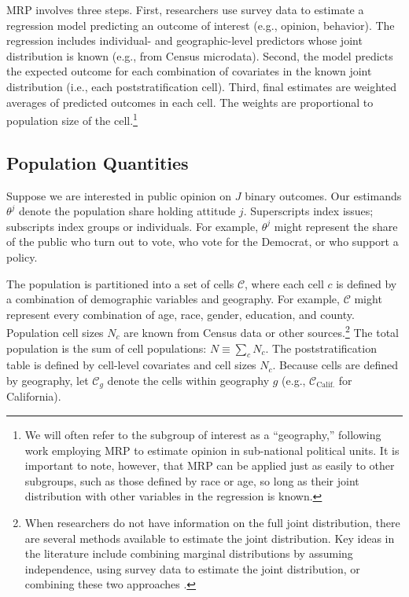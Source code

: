 MRP involves three steps. First, researchers use survey data to estimate a regression model predicting an outcome of interest (e.g., opinion, behavior). 
The regression includes individual- and geographic-level predictors whose joint distribution is known (e.g., from Census microdata). 
Second, the model predicts the expected outcome for each combination of covariates in the known joint distribution (i.e., each poststratification cell). Third, final estimates are weighted averages of predicted outcomes in each cell.
The weights are proportional to population size of the cell.\footnote{We will often refer to the subgroup of interest as a ``geography,'' following  work employing MRP to estimate opinion in sub-national political units. It is important to note, however, that MRP can be applied just as easily to other subgroups, such as those defined by race or age, so long as their joint distribution with other variables in the regression is known. }

\subsection{Population Quantities}

Suppose we are interested in public opinion on $J$ binary outcomes. Our estimands $\theta^j$ denote the population share holding attitude $j$. Superscripts index issues; subscripts index groups or individuals.
For example, $\theta^j$ might represent the share of the public who turn out to vote, who vote for the Democrat, or who support a policy.

The population is partitioned into a set of cells $\mathcal{C}$, where each cell $c$ is defined by a combination of demographic variables and geography. 
For example, $\mathcal{C}$ might represent every combination of age, race, gender, education, and county. 
Population cell sizes $N_c$ are known from Census data or other sources.\footnote{When researchers do not have information on the full joint distribution, there are several methods available to estimate the joint distribution. Key ideas in the literature include combining marginal distributions by assuming independence, using survey data to estimate the joint distribution, or combining these two approaches \citep{LW:2017,CW:2019}.\label{fn:synthps}}  
The total population is the sum of cell populations: $N \equiv \sum_c N_c$. 
The poststratification table is defined by cell-level covariates and cell sizes $N_c$.
Because cells are defined by geography, let $\mathcal{C}_g$ denote the cells within geography $g$ (e.g., $\mathcal{C}_{\text{Calif.}}$ for California).

